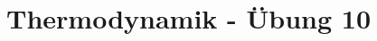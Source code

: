 \section*{\centering Thermodynamik - Übung 10} %
\label{sec:thermodynamik_bung_10}

	
	\newpage
	
	\newpage
	

